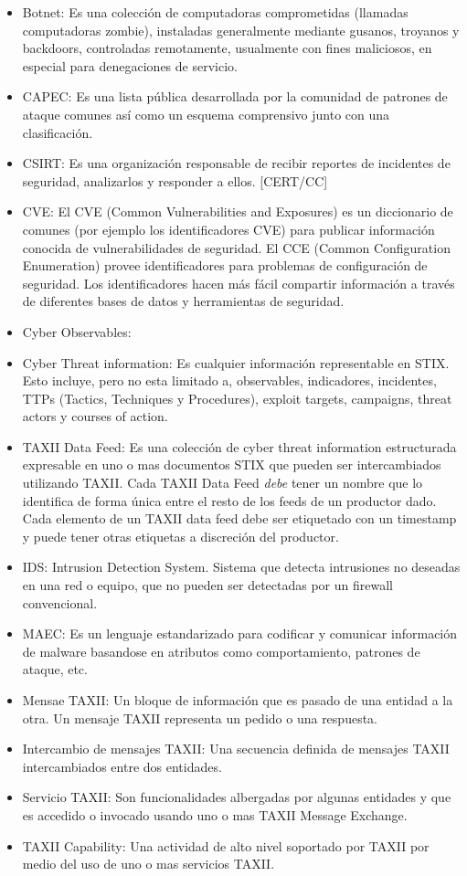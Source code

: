 \begin{itemize}
  \item Botnet: Es una colección de computadoras comprometidas (llamadas computadoras zombie), 
instaladas generalmente mediante gusanos, troyanos y backdoors, controladas 
remotamente, usualmente con fines maliciosos, en especial para denegaciones de 
servicio.
  \item CAPEC: Es una lista pública desarrollada por la comunidad de patrones de 
  ataque comunes así como un esquema comprensivo junto con una clasificación.
  \item CSIRT: Es una organización responsable de recibir reportes de incidentes de seguridad, analizarlos y responder a ellos. [CERT/CC]
  \item CVE: El CVE (Common Vulnerabilities and Exposures) es un diccionario de comunes (por 
ejemplo los identificadores CVE) para publicar información conocida de 
vulnerabilidades de seguridad. El CCE (Common Configuration Enumeration) provee 
identificadores para problemas de configuración de seguridad. Los 
identificadores hacen más fácil compartir información a través de diferentes 
bases de datos y herramientas de seguridad.
\item Cyber Observables:
 \item Cyber Threat information: Es cualquier información representable en STIX. 
 Esto incluye, pero no esta limitado a, observables, indicadores, incidentes, 
 TTPs (Tactics, Techniques y Procedures), exploit targets, campaigns, threat 
 actors y courses of action.
 \item TAXII Data Feed: Es una colección de cyber threat information 
 estructurada expresable en uno o mas documentos STIX que pueden ser 
 intercambiados utilizando TAXII. Cada TAXII Data Feed \emph{debe} tener un 
 nombre que lo identifica de forma única entre el resto de los feeds de un 
 productor dado. Cada elemento de un TAXII data feed debe ser etiquetado con un 
 timestamp y puede tener otras etiquetas a discreción del productor.
 \item IDS: Intrusion Detection System. Sistema que detecta intrusiones no deseadas en una 
red o equipo, que no pueden ser detectadas por un firewall convencional.
  \item MAEC: Es un lenguaje estandarizado para codificar y comunicar 
  información de malware basandose en atributos como comportamiento, patrones de 
  ataque, etc.
 \item Mensae TAXII: Un bloque de información que es pasado de una entidad a la 
 otra. Un mensaje TAXII representa un pedido o una respuesta.
 \item Intercambio de mensajes TAXII: Una secuencia definida de mensajes TAXII 
 intercambiados entre dos entidades.
\item Servicio TAXII: Son funcionalidades albergadas por algunas entidades y que 
es accedido o invocado usando uno o mas TAXII Message Exchange.
\item TAXII Capability: Una actividad de alto nivel soportado por TAXII por 
medio del uso de uno o mas servicios TAXII.
\end{itemize}
\newpage
